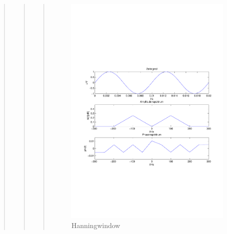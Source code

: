 \begin{quote}
\begin{quote}
\begin{quote}
            \begin{figure}[H]
            \centering
                \includegraphics[scale=0.5, trim = 1.5cm 7cm 1.5cm 8cm, clip]{./Bilder/Hanningwindow}
                    \caption{Hanningwindow}
            \end{figure}
            

\end{quote}
\end{quote}
\end{quote}
